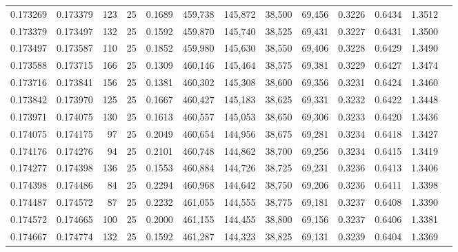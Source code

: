 \begin{tabular}{rrrrrrrrrrrrr}
0.173269 & 0.173379 &   123 &  25 &                                     0.1689 & 459,738 & 145,872 &  38,500 &  69,456 & 0.3226 & 0.6434 & 1.3512 \\
0.173379 & 0.173497 &   132 &  25 &                                     0.1592 & 459,870 & 145,740 &  38,525 &  69,431 & 0.3227 & 0.6431 & 1.3500 \\
0.173497 & 0.173587 &   110 &  25 &                                     0.1852 & 459,980 & 145,630 &  38,550 &  69,406 & 0.3228 & 0.6429 & 1.3490 \\
0.173588 & 0.173715 &   166 &  25 &                                     0.1309 & 460,146 & 145,464 &  38,575 &  69,381 & 0.3229 & 0.6427 & 1.3474 \\
0.173716 & 0.173841 &   156 &  25 &                                     0.1381 & 460,302 & 145,308 &  38,600 &  69,356 & 0.3231 & 0.6424 & 1.3460 \\
0.173842 & 0.173970 &   125 &  25 &                                     0.1667 & 460,427 & 145,183 &  38,625 &  69,331 & 0.3232 & 0.6422 & 1.3448 \\
0.173971 & 0.174075 &   130 &  25 &                                     0.1613 & 460,557 & 145,053 &  38,650 &  69,306 & 0.3233 & 0.6420 & 1.3436 \\
0.174075 & 0.174175 &    97 &  25 &                                     0.2049 & 460,654 & 144,956 &  38,675 &  69,281 & 0.3234 & 0.6418 & 1.3427 \\
0.174176 & 0.174276 &    94 &  25 &                                     0.2101 & 460,748 & 144,862 &  38,700 &  69,256 & 0.3234 & 0.6415 & 1.3419 \\
0.174277 & 0.174398 &   136 &  25 &                                     0.1553 & 460,884 & 144,726 &  38,725 &  69,231 & 0.3236 & 0.6413 & 1.3406 \\
0.174398 & 0.174486 &    84 &  25 &                                     0.2294 & 460,968 & 144,642 &  38,750 &  69,206 & 0.3236 & 0.6411 & 1.3398 \\
0.174487 & 0.174572 &    87 &  25 &                                     0.2232 & 461,055 & 144,555 &  38,775 &  69,181 & 0.3237 & 0.6408 & 1.3390 \\
0.174572 & 0.174665 &   100 &  25 &                                     0.2000 & 461,155 & 144,455 &  38,800 &  69,156 & 0.3237 & 0.6406 & 1.3381 \\
0.174667 & 0.174774 &   132 &  25 &                                     0.1592 & 461,287 & 144,323 &  38,825 &  69,131 & 0.3239 & 0.6404 & 1.3369 \\

\end{tabular}
